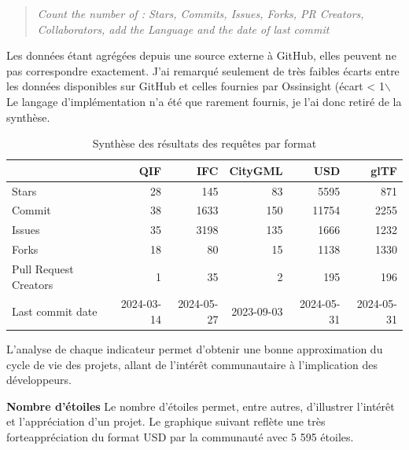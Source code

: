 \documentclass[a4paper,12pt]{article}
\begin{document}
\begin{quote}
\emph{Count the number of : Stars, Commits, Issues, Forks, PR Creators, Collaborators, add the Language and the date of last commit}
\end{quote}

Les données étant agrégées depuis une source externe à GitHub, elles peuvent ne pas correspondre exactement. J'ai remarqué seulement de très faibles écarts entre les données disponibles sur GitHub et celles fournies par Ossinsight (écart < 1$\backslash$%
Le langage d'implémentation n'a été que rarement fournis, je l'ai donc retiré de la synthèse.

\begin{table}[htbp]
\caption{Synthèse des résultats des requêtes par format}
\centering
\begin{tabular}{lrrrrr}
 & QIF\footnotemark & IFC\footnotemark & CityGML\footnotemark & USD\footnotemark & glTF\footnotemark\\
\hline
Stars & 28 & 145 & 83 & 5595 & 871\\
Commit & 38 & 1633 & 150 & 11754 & 2255\\
Issues & 35 & 3198 & 135 & 1666 & 1232\\
Forks & 18 & 80 & 15 & 1138 & 1330\\
Pull Request Creators & 1 & 35 & 2 & 195 & 196\\
Last commit date & 2024-03-14 & 2024-05-27 & 2023-09-03 & 2024-05-31 & 2024-05-31\\
\end{tabular}
\end{table}

L'analyse de chaque indicateur permet d'obtenir une bonne approximation du cycle de vie des projets, allant de l'intérêt communautaire à l'implication des développeurs.

\textbf{Nombre d'étoiles}
Le nombre d'étoiles permet, entre autres, d'illustrer l'intérêt et l'appréciation d'un projet.
Le graphique suivant reflète une très forteappréciation du format USD par la communauté avec 5 595 étoiles.
\end{document}

